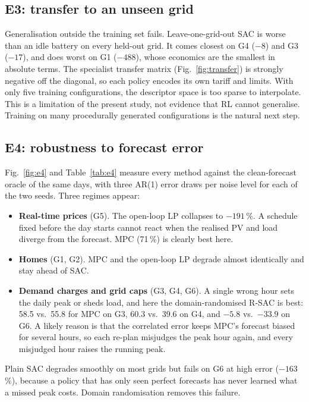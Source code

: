 \documentclass[conference]{IEEEtran}
\newcommand{\G}[1]{\textsf{#1}}
\begin{document}
\subsection{E3: transfer to an unseen grid}
Generalisation outside the training set fails. Leave-one-grid-out SAC is worse
than an idle battery on every held-out grid. It comes closest on \G{G4} ($-8$) and
\G{G3} ($-17$), and does worst on \G{G1} ($-488$), whose economics are the
smallest in absolute terms. The specialist transfer matrix
(Fig.~\ref{fig:transfer}) is strongly negative off the diagonal, so each policy
encodes its own tariff and limits. With only five training configurations, the
descriptor space is too sparse to interpolate. This is a limitation of the
present study, not evidence that RL cannot generalise. Training on many
procedurally generated configurations is the natural next step.


\subsection{E4: robustness to forecast error}
Fig.~\ref{fig:e4} and Table~\ref{tab:e4} measure every method against the
clean-forecast oracle of the same days, with three AR(1) error draws per noise level for
each of the two seeds. Three regimes appear:
\begin{itemize}
\item \textbf{Real-time prices} (\G{G5}). The open-loop LP collapses to $-191$\,\%. A
schedule fixed before the day starts cannot react when the realised PV and load
diverge from the forecast. MPC (71\,\%) is clearly best here.
\item \textbf{Homes} (\G{G1}, \G{G2}). MPC and the open-loop LP degrade
almost identically and stay ahead of SAC.
\item \textbf{Demand charges and grid caps} (\G{G3}, \G{G4}, \G{G6}). A single
wrong hour sets the daily peak or sheds load, and here the domain-randomised R-SAC is
best: 58.5 vs.\ 55.8 for MPC on \G{G3}, 60.3 vs.\ 39.6 on \G{G4}, and $-5.8$ vs.\
$-33.9$ on \G{G6}. A likely reason is that the correlated error keeps MPC's
forecast biased for several hours, so each re-plan misjudges the peak hour
again, and every misjudged hour raises the running peak.
\end{itemize}
Plain SAC degrades smoothly on most grids but fails on \G{G6} at high error
($-163$\,\%), because a policy that has only seen perfect forecasts has never
learned what a missed peak costs. Domain randomisation removes this failure.
\end{document}
